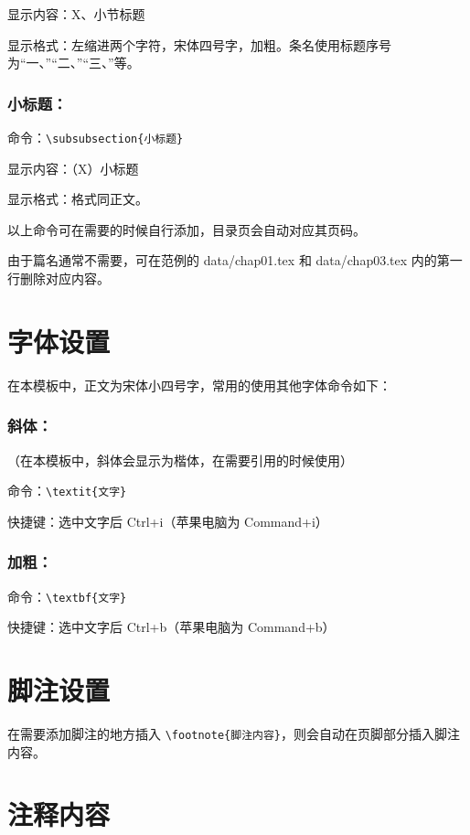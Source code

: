 显示内容：X、小节标题

显示格式：左缩进两个字符，宋体四号字，加粗。条名使用标题序号为“一、”“二、”“三、”等。

\subsubsection{小标题：}

命令：\verb|\subsubsection{小标题}|

显示内容：（X）小标题

显示格式：格式同正文。

以上命令可在需要的时候自行添加，目录页会自动对应其页码。

由于篇名通常不需要，可在范例的 data/chap01.tex 和 data/chap03.tex 内的第一行删除对应内容。

\section{字体设置}

在本模板中，正文为宋体小四号字，常用的使用其他字体命令如下：

\subsubsection{斜体：}

（在本模板中，斜体会显示为楷体，在需要引用的时候使用）

命令：\verb|\textit{文字}|

快捷键：选中文字后 Ctrl+i（苹果电脑为 Command+i）

\subsubsection{加粗：}

命令：\verb|\textbf{文字}|

快捷键：选中文字后 Ctrl+b（苹果电脑为 Command+b）

\section{脚注设置}

在需要添加脚注的地方插入 \verb|\footnote{脚注内容}|，则会自动在页脚部分插入脚注内容。

\section{注释内容}

